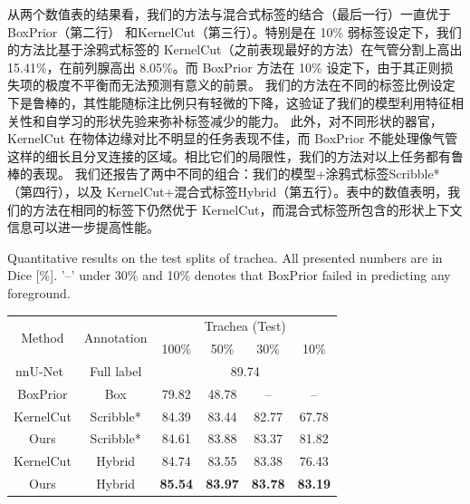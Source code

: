 从两个数值表的结果看，我们的方法与混合式标签的结合（最后一行）一直优于 BoxPrior\citep{kervadec2020bounding}（第二行） 和KernelCut\citep{tang2018regularized}（第三行）。特别是在 10\% 弱标签设定下，我们的方法比基于涂鸦式标签的 KernelCut（之前表现最好的方法）在气管分割上高出 15.41\%，在前列腺高出 8.05\%。而 BoxPrior 方法在 10\% 设定下，由于其正则损失项的极度不平衡而无法预测有意义的前景。%
我们的方法在不同的标签比例设定下是鲁棒的，其性能随标注比例只有轻微的下降，这验证了我们的模型利用特征相关性和自学习的形状先验来弥补标签减少的能力。
此外，对不同形状的器官，KernelCut 在物体边缘对比不明显的任务表现不佳，而 BoxPrior 不能处理像气管这样的细长且分叉连接的区域。相比它们的局限性，我们的方法对以上任务都有鲁棒的表现。    %
我们还报告了两中不同的组合：我们的模型+涂鸦式标签Scribble*（第四行），以及 KernelCut+混合式标签Hybrid（第五行）。表中的数值表明，我们的方法在相同的标签下仍然优于 KernelCut，而混合式标签所包含的形状上下文信息可以进一步提高性能。


    \begin{table}[t!]
        {Quantitative results on the test splits of trachea. All presented numbers are in Dice [\%]. '--' under 30\% and 10\% denotes that BoxPrior failed in predicting any foreground.}
        \centering    
            \begin{tabular}{c|c|c c c c }
                \toprule
                \multirow{2}{*}{Method} & \multirow{2}{*}{Annotation} & \multicolumn{4}{c}{Trachea (Test)}  \\ 
                &                        & 100\% & 50\% & 30\% & 10\%                             \\ \midrule
                nnU-Net~\cite{isensee2019automated}     & Full label        & \multicolumn{4}{c}{89.74}          \\ \cmidrule{1-6}
                BoxPrior\cite{kervadec2020bounding}    & Box  & 79.82  & 48.78  & -- & --  \\
                KernelCut\cite{tang2018regularized}   & Scribble* & 84.39  & 83.44  & 82.77  & 67.78  \\
                Ours & Scribble* & 84.61 & 83.88 & 83.37 & 81.82  \\
                KernelCut\cite{tang2018regularized}   & Hybrid & 84.74 & 83.55	& 83.38	& 76.43             \\
                Ours        & Hybrid    & \textbf{85.54} & \textbf{83.97} & \textbf{83.78} & \textbf{83.19}                           \\
                \bottomrule
            \end{tabular}
        
        \label{tab:test_res1}
    \end{table}



